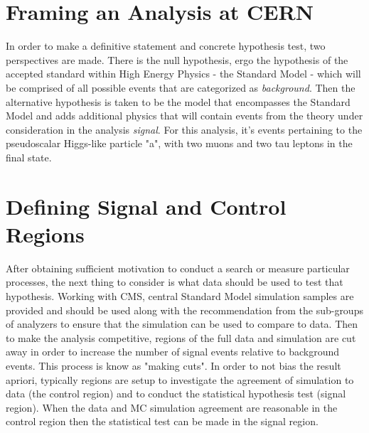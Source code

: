 \section{Framing an Analysis at CERN}
In order to make a definitive statement and concrete hypothesis test, two perspectives are made. There is the null hypothesis, ergo the hypothesis of the accepted standard within High Energy Physics - the Standard Model - which will be comprised of all possible events that are categorized as \textit{background}. 
Then the alternative hypothesis is taken to be the model that encompasses the Standard Model and adds additional physics that will contain events from the theory under consideration in the analysis \textit{signal}. For this analysis, it's events pertaining to the pseudoscalar Higgs-like particle "a", with two muons and two tau leptons in the final state. 

\section{Defining Signal and Control Regions}
After obtaining sufficient motivation to conduct a search or measure particular processes, the next thing to consider is what data should be used to test that hypothesis. Working with CMS, central Standard Model simulation samples are provided and should be used along with the recommendation from the sub-groups of analyzers to ensure that the simulation can be used to compare to data. Then to make the analysis competitive, regions of the full data and simulation are cut away in order to increase the number of signal events relative to background events. This process is know as "making cuts". In order to not bias the result apriori, typically regions are setup to investigate the agreement of simulation to data (the control region) and to conduct the statistical hypothesis test (signal region). When the data and MC simulation agreement are reasonable in the control region then the statistical test can be made in the signal region.  



